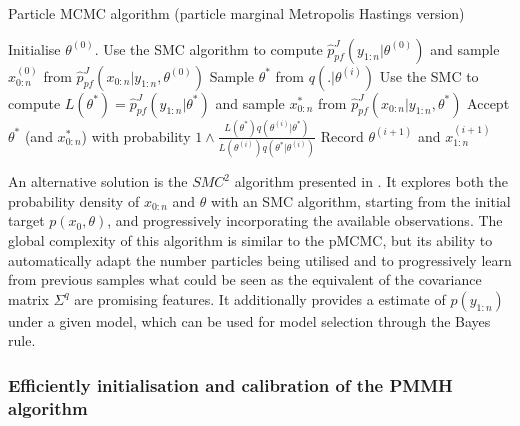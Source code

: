 \documentclass[a4paper,11pt,titlepage]{article}
\theoremstyle{plain} %
\begin{document}
\begin{algorithm}[h]
\caption{Particle MCMC algorithm (particle marginal Metropolis Hastings version)}
\label{alg:PMCMC}
{\fontsize{12}{20}\selectfont
\begin{algorithmic}
\STATE Initialise $\theta^{(0)}$.
\STATE Use the SMC algorithm to compute  $\hat{p}^J_{pf}(y_{1:n}|\theta^{(0)})$ and sample $x^{(0)}_{0:n}$ from $\hat{p}_{pf}^J(x_{0:n}|y_{1:n},\theta^{(0)})$
	\STATE Sample $\theta^{*}$ from $q(.|\theta^{(i)})$
	\STATE Use the SMC to compute $L(\theta^*)=\hat{p}^J_{pf}(y_{1:n}|\theta^*)$ and sample $x_{0:n}^{*}$ from $\hat{p}_{pf}^J(x_{0:n}|y_{1:n},\theta^*) $
	\STATE Accept $\theta^{*}$ (and  $x_{0:n}^{*}$) with probability $1\wedge\frac{L(\theta^{*})q(\theta^{(i)}|\theta^{*})}{L(\theta^{(i)})q(\theta^{*}|\theta^{(i)})}$
	\STATE Record $\theta^{(i+1)}$ and $x^{(i+1)}_{1:n}$
\ENDFOR
\end{algorithmic}
}
\end{algorithm}


An alternative solution is the $SMC^2$ algorithm presented in \cite{Chopin2012}. It explores both the probability density of $x_{0:n}$ and $\theta$ with an SMC algorithm, starting from the initial target $p(x_0,\theta)$, and progressively incorporating  the available observations. The global complexity of this algorithm is similar to the pMCMC, but its ability to automatically adapt the number particles being utilised and to progressively learn from previous samples what could be seen as the equivalent of the covariance matrix $\Sigma^q$ are promising features. It additionally provides a estimate of $p(y_{1:n})$ under a given model, which can be used for model selection through the Bayes rule.


\subsubsection{Efficiently initialisation and calibration of the PMMH algorithm}
\end{document}
